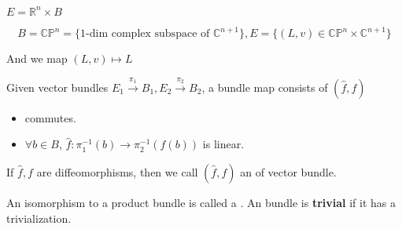 
\begin{example}
    $ E=\mathbb{R}^n\times B $ 
\end{example}
\begin{example}
    \[B=\mathbb{CP}^n= \{\text{1-dim complex subspace of }\mathbb{C}^{n+1}\},E= \{(L,v)\in\mathbb{CP}^n\times \mathbb{C}^{n+1}\}  \]

    And we map  $ (L,v)\mapsto L $  
\end{example}
Given vector bundles  $ E_1\xrightarrow{\pi_1} B_1,E_2\xrightarrow{\pi_2} B_2 $, a bundle map consists of  $ (\hat{f},f) $ \st
\tikzset{external/export=false}
\begin{itemize}
   \item 
   commutes.
   \item  $ \forall b\in  B  $,  $ \hat{f}:\pi_1^{-1}(b)\rightarrow \pi_2^{-1}(f(b)) $ is linear.
\end{itemize}
\tikzset{external/export=true}
If  $ \hat{f},f $ are diffeomorphisms, then we call  $ (\hat{f},f) $ an  of vector bundle.

An isomorphism to a product bundle is called a . An bundle is \textbf{trivial} if it has a trivialization.

